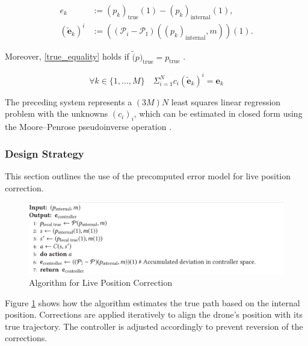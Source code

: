\documentclass[10pt,journal,compsoc]{IEEEtran}
\begin{document}
\begin{equation}\label{errors_def}
\begin{aligned}
    e_k &:= (p_k)_{\text{true}}(1) - (p_k)_{\text{internal}}(1), \\
    (\tilde{\mathbf{e}}_k)^i &:= ((\mathcal{P}_i - \mathcal{P}_{\mathbb{I}})((p_k)_{\text{internal}}, m))(1).
\end{aligned}
\end{equation}

Moreover, \eqref{true_equality} holds if $\tilde(p)_{\text{true}} = p_{\text{true}}$ \cite{studied}.

\begin{equation}\label{true_equality}
    \forall k \in \{1, \dots, M \} \quad \Sigma_{i=1}^{N} c_i (\tilde{\mathbf{e}}_k)^i = \mathbf{e}_k
\end{equation}

The preceding system represents a $(3M)N$ least squares linear regression problem with the unknowns $(c_i)_i$, which can be estimated in closed form using the Moore–Penrose pseudoinverse operation \cite{studied} \cite{BenGre}.

\subsubsection{Design Strategy}

This section outlines the use of the precomputed error model for live position correction.

\begin{figure}[h]
    \centering
    \includegraphics[width=\linewidth]{rsc/live_correction.png}
    \caption{Algorithm for Live Position Correction \cite{studied}}
    \label{fig:live_correction}
\end{figure}

Figure \ref{fig:live_correction} shows how the algorithm estimates the true path based on the internal position. Corrections are applied iteratively to align the drone's position with its true trajectory. The controller is adjusted accordingly to prevent reversion of the corrections.
\end{document}
